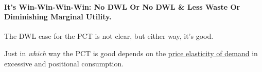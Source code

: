 




\paragraph{It's Win-Win-Win-Win: No DWL Or No DWL \& Less Waste Or Diminishing Marginal Utility.}  \label{sec:WinWin} The DWL case for the PCT is not clear, but either way, it's good. 

Just in \emph{which} way the PCT is good depends on the \hyperref[eq:PED]{price elasticity of demand} in excessive and positional consumption. 


